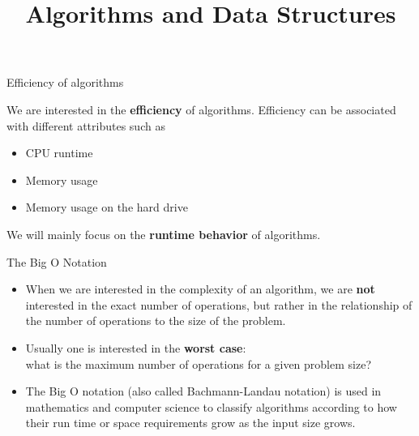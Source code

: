 \documentclass[11pt,compress,t,notes=noshow, xcolor=table]{beamer}
\title{Algorithms and Data Structures}
\begin{document}


\begin{vbframe}{Efficiency of algorithms}

We are interested in the \textbf{efficiency} of algorithms. Efficiency can be associated with different attributes such as
  \begin{itemize}
    \item CPU runtime
    \item Memory usage
    \item Memory usage on the hard drive
  \end{itemize}

\lz

We will mainly focus on the \textbf{runtime behavior} of algorithms.

\end{vbframe}

\begin{vbframe}{The Big O Notation}

\begin{itemize}
\item When we are interested in the complexity of an algorithm, we are \textbf{not} interested in the exact number of operations, but rather in the relationship of the number of operations to the size of the problem.
  \item Usually one is interested in the \textbf{worst case}:\\
  what is the maximum number of operations for a given problem size?
  \item The Big O notation (also called Bachmann-Landau notation) is used in mathematics
  and computer science to classify algorithms according to how their run time or space requirements grow as the input size grows.
\end{itemize}


\end{vbframe}
\end{document}
